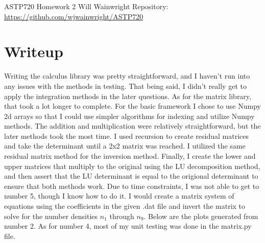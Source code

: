 \documentclass[twocolumn,11pt]{article}
\begin{document}
\pagestyle{plain}
\onecolumn
ASTP720 
\newline Homework 2
\newline Will Wainwright
\newline Repository: \href{https://github.com/wjwainwright/ASTP720}{https://github.com/wjwainwright/ASTP720}

\section*{Writeup}
Writing the calculus library was pretty straightforward, and I haven't run into any issues with the methods in testing. That being said, I didn't really get to apply the integration methods in the later questions. As for the matrix library, that took a lot longer to complete. For the basic framework I chose to use Numpy 2d arrays so that I could use simpler algorithms for indexing and utilize Numpy methods. The addition and multiplication were relatively straightforward, but the later methods took the most time. I used recursion to create residual matrices and take the determinant until a 2x2 matrix was reached. I utilized the same residual matrix method for the inversion method. Finally, I create the lower and upper matrices that multiply to the original using the LU decomposition method, and then assert that the LU determinant is equal to the origional determinant to ensure that both methods work. Due to time constraints, I was not able to get to number 5, though I know how to do it. I would create a matrix system of equations using the coefficients in the given .dat file and invert the matrix to solve for the number densities $n_1$ through $n_9$. Below are the plots generated from number 2. As for number 4, most of my unit testing was done in the matrix.py file.
\end{document}
